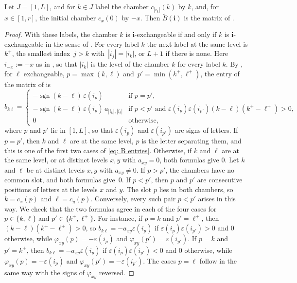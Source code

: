 \documentclass[a4paper]{amsart}
\numberwithin{equation}{section}
\theoremstyle{definition}
\theoremstyle{remark}
\newcommand{\bfi}{\mathbf{i}}
\newcommand{\tB}{\widetilde{B}}
\begin{document}
\begin{proposition}
  \label{prop: BFZ}
  Let $J=[1,L]$, and for $k\in J$ label the chamber $c_{|i_k|}(k)$ by $k$, and, for $x\in[1,r]$, the initial chamber $c_x(0)$ by $-x$.
  Then $\tB(\bfi)$ is the matrix of \cite[Definition~2.3]{BFZ05}.
\end{proposition}
\begin{proof}
  With these labels, the chamber $k$ is $\bfi$-exchangeable if and only if $k$ is $\bfi$-exchangeable in the sense of \cite[Section~2.2]{BFZ05}.
  For every label $k$ the next label at the same level is $k^+$, the smallest index~$j>k$ with~$|i_j|=|i_k|$, or $L+1$ if there is none.
  Here $i_{-x}:=-x$ as in \cite{BFZ05}, so that $|i_k|$ is the level of the chamber $k$ for every label $k$.
  By \cite[Remark~2.4]{BFZ05}, for $\ell$ exchangeable, $p=\max(k,\ell)$ and~$p'=\min(k^+,\ell^+)$, the entry of the matrix of \cite{BFZ05} is
  \begin{equation}
    \label{eq: BFZ entries}
    b_{k\ell}=
    \begin{cases}
      -\operatorname{sgn}(k-\ell)\,\varepsilon(i_p) & \text{if } p=p',\\
      -\operatorname{sgn}(k-\ell)\,\varepsilon(i_p)\,a_{|i_k|,|i_\ell|} & \text{if } p<p' \text{ and } \varepsilon(i_p)\varepsilon(i_{p'})(k-\ell)(k^+-\ell^+)>0,\\
      0 & \text{otherwise,}
    \end{cases}
  \end{equation}
  where $p$ and $p'$ lie in $[1,L]$, so that $\varepsilon(i_p)$ and $\varepsilon(i_{p'})$ are signs of letters.
  If $p=p'$, then $k$ and $\ell$ are at the same level, $p$ is the letter separating them, and this is one of the first two cases of \eqref{eq: B entries}.
  Otherwise, if $k$ and $\ell$ are at the same level, or at distinct levels $x,y$ with $a_{xy}=0$, both formulas give $0$.
  Let $k$ and $\ell$ be at distinct levels $x,y$ with $a_{xy}\neq0$.
  If $p>p'$, the chambers have no common slot, and both formulas give~$0$.
  If $p<p'$, then $p$ and $p'$ are consecutive positions of letters at the levels $x$ and $y$.
  The slot $p$ lies in both chambers, so $k=c_x(p)$ and $\ell=c_y(p)$.
  Conversely, every such pair $p<p'$ arises in this way.
  We check that the two formulas agree in each of the four cases for $p\in\{k,\ell\}$ and $p'\in\{k^+,\ell^+\}$.
  For instance, if $p=k$ and $p'=\ell^+$, then $(k-\ell)(k^+-\ell^+)>0$, so $b_{k\ell}=-a_{xy}\varepsilon(i_p)$ if $\varepsilon(i_p)\varepsilon(i_{p'})>0$ and $0$ otherwise, while $\varphi_{xy}(p)=-\varepsilon(i_p)$ and $\varphi_{xy}(p')=\varepsilon(i_{p'})$.
  If $p=k$ and $p'=k^+$, then $b_{k\ell}=-a_{xy}\varepsilon(i_p)$ if $\varepsilon(i_p)\varepsilon(i_{p'})<0$ and $0$ otherwise, while $\varphi_{xy}(p)=-\varepsilon(i_p)$ and $\varphi_{xy}(p')=-\varepsilon(i_{p'})$.
  The cases $p=\ell$ follow in the same way with the signs of $\varphi_{xy}$ reversed.
\end{proof}
\end{document}
